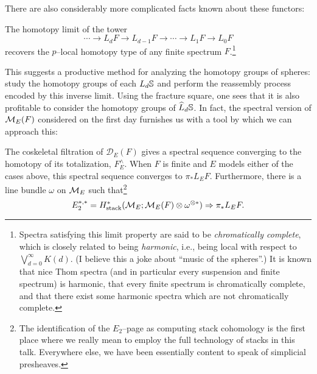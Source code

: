 There are also considerably more complicated facts known about these functors:
\begin{theorem}
The homotopy limit of the tower \[\cdots \to L_d F \to L_{d-1} F \to \cdots \to L_1 F \to L_0 F\] recovers the $p$--local homotopy type of any finite spectrum $F$.\footnote{Spectra satisfying this limit property are said to be \textit{chromatically complete}, which is closely related to being \textit{harmonic}, i.e., being local with respect to $\bigvee_{d=0}^\infty K(d)$.  (I believe this a joke about ``music of the spheres''.)  It is known that nice Thom spectra (and in particular every suspension and finite spectrum) is harmonic, that every finite spectrum is chromatically complete, and that there exist some harmonic spectra which are not chromatically complete.}
\end{theorem}

\noindent This suggests a productive method for analyzing the homotopy groups of spheres: study the homotopy groups of each $L_d \S$ and perform the reassembly process encoded by this inverse limit.  Using the fracture square, one sees that it is also profitable to consider the homotopy groups of $\widehat L_d \S$.  In fact, the spectral version of $\context{E}(F)$ considered on the first day furnishes us with a tool by which we can approach this:

\begin{theorem}[Bousfield, et al.]
The coskeletal filtration of $\mathcal D_E(F)$ gives a spectral sequence converging to the homotopy of its totalization, $F^\wedge_E$.  When $F$ is finite and $E$ models either of the cases above, this spectral sequence converges to $\pi_* L_E F$.  Furthermore, there is a line bundle $\omega$ on $\context{E}$ such that\footnote{The identification of the $E_2$--page as computing stack cohomology is the first place where we really mean to employ the full technology of stacks in this talk.  Everywhere else, we have been essentially content to speak of simplicial presheaves.} \[E_2^{*, *} = H^*_{\mathrm{stack}}(\context{E}; \context{E}(F) \otimes \omega^{\otimes *}) \Rightarrow \pi_* L_E F.\]
\end{theorem}

